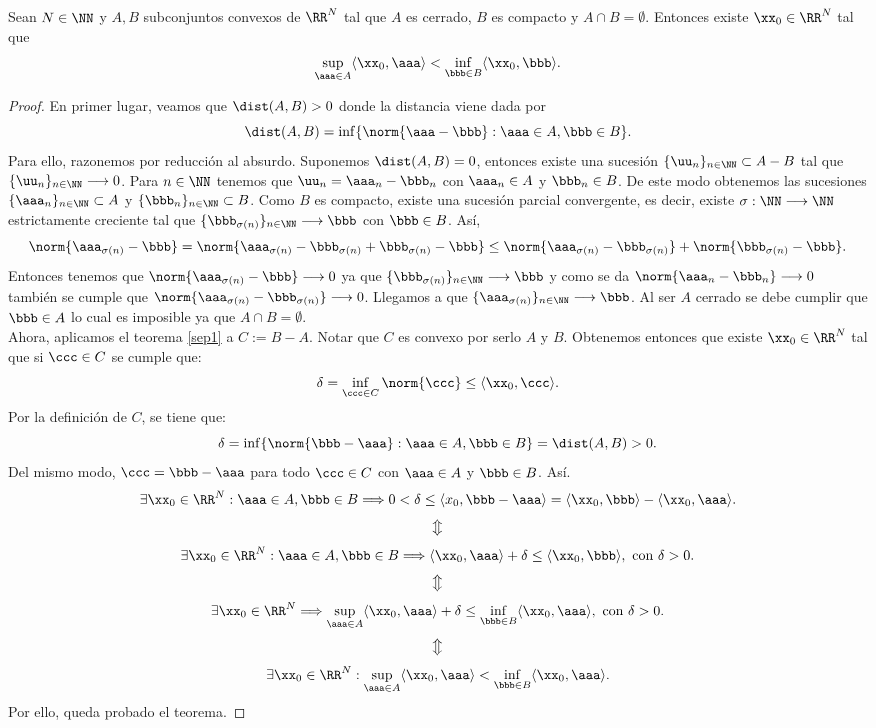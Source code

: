 \bigskip
\begin{teoremaBox}\label{separacion1}
Sean $ N\in \NN $ y $ A,B $ subconjuntos convexos de $ \RR^N $ tal que $ A $ es cerrado, $ B $ es compacto y $ A \cap B = \emptyset$. Entonces existe $ \xx_0 \in \RR^N $ tal que
\[
\sup_{\aaa \in A} \langle \xx_0,\aaa\rangle < \inf_{\bbb\in B} \langle \xx_0,\bbb\rangle.
\]
\end{teoremaBox}
\begin{proof}
En primer lugar, veamos que $ \dist(A,B) > 0 $ donde la distancia viene dada por \[\dist(A,B) = \inf\{ \norm{\aaa-\bbb} : \aaa\in A, \bbb\in B\}.\]
Para ello, razonemos por reducción al absurdo. Suponemos $ \dist(A,B) = 0 $, entonces existe una sucesión $ \{\uu_n\}_{n\in\NN} \subset A-B $ tal que $ \{\uu_n\}_{n\in\NN} \longrightarrow 0 $. Para $ n\in\NN $ tenemos que $ \uu_n = \aaa_n - \bbb_n $ con $ \aaa_n \in A $ y $ \bbb_n \in B $. De este modo obtenemos las sucesiones $ \{\aaa_n\}_{n\in\NN} \subset A $ y $ \{\bbb_n\}_{n\in\NN} \subset B $. Como $ B $ es compacto, existe una sucesión parcial convergente, es decir, existe $ \sigma: \NN \longrightarrow \NN $ estrictamente creciente tal que $ \{\bbb_{\sigma(n)}\}_{n\in\NN} \longrightarrow \bbb$ con $ \bbb \in B $. Así,
\[
\norm{\aaa_{\sigma(n)}-\bbb} = \norm{\aaa_{\sigma(n)} - \bbb_{\sigma(n)} + \bbb_{\sigma(n)} - \bbb} \leq  \norm{\aaa_{\sigma(n)} - \bbb_{\sigma(n)}} + \norm{\bbb_{\sigma(n)} - \bbb}.
\]
Entonces tenemos que $ \norm{\aaa_{\sigma(n)}-\bbb} \longrightarrow 0 $ ya que $ \{\bbb_{\sigma(n)}\}_{n\in\NN} \longrightarrow \bbb$ y como se da $ \norm{\aaa_n - \bbb_n}\longrightarrow 0$ también se cumple que $ \norm{\aaa_{\sigma(n)} - \bbb_{\sigma(n)}}\longrightarrow 0$. Llegamos a que $ \{\aaa_{\sigma(n)}\}_{n\in\NN} \longrightarrow \bbb$. Al ser $ A $ cerrado se debe cumplir que $ \bbb \in A $ lo cual es imposible ya que $ A \cap B = \emptyset$. \\

Ahora, aplicamos el teorema \ref{sep1} a $ C:= B-A $. Notar que $ C $ es convexo por serlo $ A $ y $ B $. Obtenemos entonces que existe $ \xx_0 \in \RR^N $ tal que si $ \ccc \in C $ se cumple que:
\[
\delta = \inf_{\ccc \in C} \norm{\ccc} \leq \langle \xx_0, \ccc\rangle.
\]
Por la definición de $ C $, se tiene que:
\[
\delta = \inf\{ \norm{\bbb-\aaa} : \aaa\in A, \bbb\in B\} = \dist(A,B) > 0.
\] 
Del mismo modo, $ \ccc = \bbb-\aaa $ para todo $ \ccc \in C $ con $ \aaa \in A $ y $ \bbb \in B $. Así.
\[
\exists \xx_0 \in \RR^N: \aaa\in A, \bbb\in B \Longrightarrow 0 <\delta \leq \langle x_0, \bbb-\aaa\rangle = \langle \xx_0, \bbb\rangle - \langle \xx_0,\aaa\rangle.
\]
\[
\big\Updownarrow
\]
\[
\exists \xx_0 \in \RR^N: \aaa\in A, \bbb\in B \Longrightarrow \langle \xx_0, \aaa\rangle + \delta \leq \langle \xx_0, \bbb\rangle ,\text{ con } \delta > 0.
\]
\[
\big\Updownarrow
\]
\[
\exists \xx_0 \in \RR^N \Longrightarrow \sup_{\aaa\in A}\langle \xx_0, \aaa\rangle + \delta \leq \inf_{\bbb \in B}\langle \xx_0, \aaa\rangle, \text{ con } \delta > 0.
\]
\[
\big\Updownarrow
\]
\[
\exists \xx_0 \in \RR^N : \sup_{\aaa\in A}\langle \xx_0, \aaa\rangle < \inf_{\bbb \in B}\langle \xx_0, \aaa\rangle.
\]
Por ello, queda probado el teorema.
\end{proof}
\bigskip

